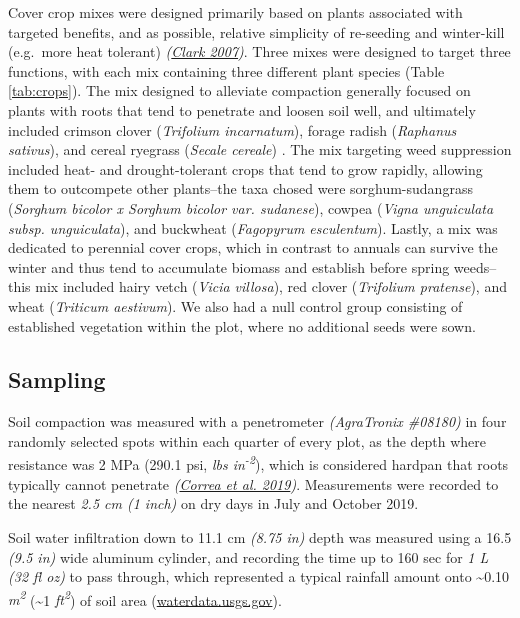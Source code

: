 \documentclass[
]{article}
\begin{document}
Cover crop mixes were designed primarily based on plants associated with targeted benefits, and as possible, relative simplicity of re-seeding and winter-kill (e.g.~more heat tolerant) \emph{(\protect\hyperlink{ref-clark07}{Clark 2007})}.
Three mixes were designed to target three functions, with each mix containing three different plant species (Table \ref{tab:crops}).
The mix designed to alleviate compaction generally focused on plants with roots that tend to penetrate and loosen soil well, and ultimately included
crimson clover (\emph{Trifolium incarnatum}),
forage radish (\emph{Raphanus sativus}), and
cereal ryegrass (\emph{Secale cereale})
.
The mix targeting weed suppression included heat- and drought-tolerant crops that tend to grow rapidly, allowing them to outcompete other plants--the taxa chosed were
sorghum-sudangrass (\emph{Sorghum bicolor x Sorghum bicolor var. sudanese}),
cowpea (\emph{Vigna unguiculata subsp. unguiculata}), and
buckwheat (\emph{Fagopyrum esculentum}).
Lastly, a mix was dedicated to perennial cover crops, which in contrast to annuals can survive the winter and thus tend to accumulate biomass and establish before spring weeds--this mix included
hairy vetch (\emph{Vicia villosa}),
red clover (\emph{Trifolium pratense}), and
wheat (\emph{Triticum aestivum}).
We also had a null control group consisting of established vegetation within the plot, where no additional seeds were sown.

\hypertarget{sampling}{%
\subsection{Sampling}\label{sampling}}

Soil compaction was measured with a penetrometer \emph{(AgraTronix \#08180)} in four randomly selected spots within each quarter of every plot, as the depth where resistance was 2 MPa (290.1 psi, \emph{lbs in\textsuperscript{-2}}), which is considered hardpan that roots typically cannot penetrate \emph{(\protect\hyperlink{ref-correa19}{Correa et al. 2019})}.
Measurements were recorded to the nearest \emph{2.5 cm (1 inch)} on dry days in July and October 2019.

Soil water infiltration down to 11.1 cm \emph{(8.75 in)} depth was measured using a 16.5 \emph{(9.5 in)} wide aluminum cylinder, and recording the time up to 160 sec for \emph{1 L (32 fl oz)} to pass through, which represented a typical rainfall amount onto \textasciitilde0.10 \emph{m\textsuperscript{2}} (\textasciitilde1 \emph{ft\textsuperscript{2}}) of soil area (\url{waterdata.usgs.gov}).
\end{document}
